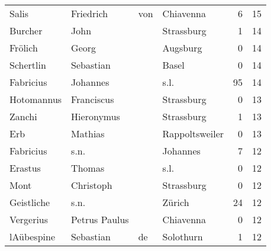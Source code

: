 \begin{tabular}{llllrr}
                    Salis &                          Friedrich &         von &                                   Chiavenna &          6 &        15 \\
                  Burcher &                               John &             &                                  Strassburg &          1 &        14 \\
                  Frölich &                              Georg &             &                                    Augsburg &          0 &        14 \\
                Schertlin &                          Sebastian &             &                                       Basel &          0 &        14 \\
                Fabricius &                           Johannes &             &                                        s.l. &         95 &        14 \\
               Hotomannus &                         Franciscus &             &                                  Strassburg &          0 &        13 \\
                   Zanchi &                         Hieronymus &             &                                  Strassburg &          1 &        13 \\
                      Erb &                            Mathias &             &                              Rappoltsweiler &          0 &        13 \\
                Fabricius &                               s.n. &             &                                    Johannes &          7 &        12 \\
                  Erastus &                             Thomas &             &                                        s.l. &          0 &        12 \\
                     Mont &                          Christoph &             &                                  Strassburg &          0 &        12 \\
               Geistliche &                               s.n. &             &                                      Zürich &         24 &        12 \\
                Vergerius &                      Petrus Paulus &             &                                   Chiavenna &          0 &        12 \\
               lAübespine &                          Sebastian &          de &                                   Solothurn &          1 &        12 \\

\end{tabular}
